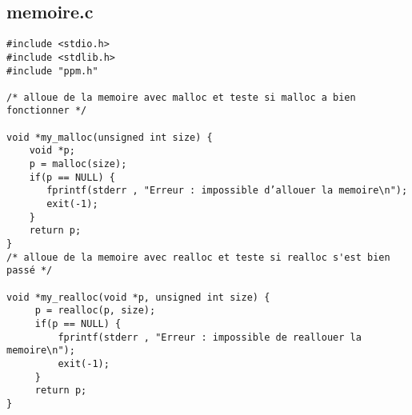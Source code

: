\documentclass[a4paper , 10pt]{article}
\begin{document}
\subsection{memoire.c}
\begin{verbatim}
#include <stdio.h>
#include <stdlib.h>
#include "ppm.h"

/* alloue de la memoire avec malloc et teste si malloc a bien fonctionner */

void *my_malloc(unsigned int size) {
    void *p;
    p = malloc(size);
    if(p == NULL) {
       fprintf(stderr , "Erreur : impossible d’allouer la memoire\n");
       exit(-1);
    }
    return p;
}
/* alloue de la memoire avec realloc et teste si realloc s'est bien passé */

void *my_realloc(void *p, unsigned int size) {
     p = realloc(p, size);
     if(p == NULL) {
         fprintf(stderr , "Erreur : impossible de reallouer la memoire\n");
         exit(-1);
     }
     return p;
}
\end{verbatim}
\newpage
\end{document}
